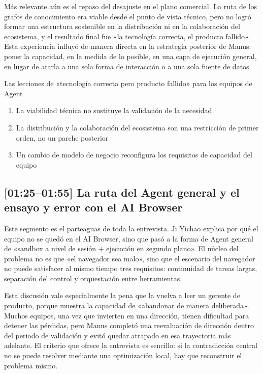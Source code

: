 \documentclass[a4paper]{article}
\begin{document}
Más relevante aún es el repaso del desajuste en el plano comercial. La ruta de los grafos de conocimiento era viable desde el punto de vista técnico, pero no logró formar una estructura sostenible en la distribución ni en la colaboración del ecosistema, y el resultado final fue «la tecnología correcta, el producto fallido». Esta experiencia influyó de manera directa en la estrategia posterior de Manus: poner la capacidad, en la medida de lo posible, en una capa de ejecución general, en lugar de atarla a una sola forma de interacción o a una sola fuente de datos.

\begin{importantbox}{Las lecciones de «tecnología correcta pero producto fallido» para los equipos de Agent}
\begin{enumerate}
    \item La viabilidad técnica no sustituye la validación de la necesidad
    \item La distribución y la colaboración del ecosistema son una restricción de primer orden, no un parche posterior
    \item Un cambio de modelo de negocio reconfigura los requisitos de capacidad del equipo
\end{enumerate}
\end{importantbox}

\subsection{[01:25--01:55] La ruta del Agent general y el ensayo y error con el AI Browser}

Este segmento es el parteaguas de toda la entrevista. Ji Yichao explica por qué el equipo no se quedó en el AI Browser, sino que pasó a la forma de Agent general de «sandbox a nivel de sesión + ejecución en segundo plano». El núcleo del problema no es que «el navegador sea malo», sino que el escenario del navegador no puede satisfacer al mismo tiempo tres requisitos: continuidad de tareas largas, separación del control y orquestación entre herramientas.

Esta discusión vale especialmente la pena que la vuelva a leer un gerente de producto, porque muestra la capacidad de «abandonar de manera deliberada». Muchos equipos, una vez que invierten en una dirección, tienen dificultad para detener las pérdidas, pero Manus completó una reevaluación de dirección dentro del periodo de validación y evitó quedar atrapado en esa trayectoria más adelante. El criterio que ofrece la entrevista es sencillo: si la contradicción central no se puede resolver mediante una optimización local, hay que reconstruir el problema mismo.
\end{document}
